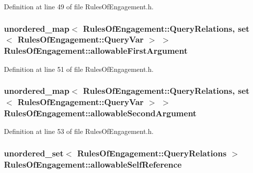 Definition at line 49 of file Rules\-Of\-Engagement.\-h.

\hypertarget{class_rules_of_engagement_a0a16b8602e2522f007f54f157a0f1203}{
\subsubsection[{allowable\-First\-Argument}]{\setlength{\rightskip}{0pt plus 5cm}unordered\-\_\-map$<$ {\bf Rules\-Of\-Engagement\-::\-Query\-Relations}, set$<$ {\bf Rules\-Of\-Engagement\-::\-Query\-Var} $>$ $>$ Rules\-Of\-Engagement\-::allowable\-First\-Argument\hspace{0.3cm}{\ttfamily [static]}}}\label{class_rules_of_engagement_a0a16b8602e2522f007f54f157a0f1203}


Definition at line 51 of file Rules\-Of\-Engagement.\-h.

\hypertarget{class_rules_of_engagement_a365f61557120f33a18021667e746f13e}{
\subsubsection[{allowable\-Second\-Argument}]{\setlength{\rightskip}{0pt plus 5cm}unordered\-\_\-map$<$ {\bf Rules\-Of\-Engagement\-::\-Query\-Relations}, set$<$ {\bf Rules\-Of\-Engagement\-::\-Query\-Var} $>$ $>$ Rules\-Of\-Engagement\-::allowable\-Second\-Argument\hspace{0.3cm}{\ttfamily [static]}}}\label{class_rules_of_engagement_a365f61557120f33a18021667e746f13e}


Definition at line 53 of file Rules\-Of\-Engagement.\-h.

\hypertarget{class_rules_of_engagement_a8c7c45f1c886563e1a9e62cd0c22866d}{
\subsubsection[{allowable\-Self\-Reference}]{\setlength{\rightskip}{0pt plus 5cm}unordered\-\_\-set$<$ {\bf Rules\-Of\-Engagement\-::\-Query\-Relations} $>$ Rules\-Of\-Engagement\-::allowable\-Self\-Reference\hspace{0.3cm}{\ttfamily [static]}}}\label{class_rules_of_engagement_a8c7c45f1c886563e1a9e62cd0c22866d}


